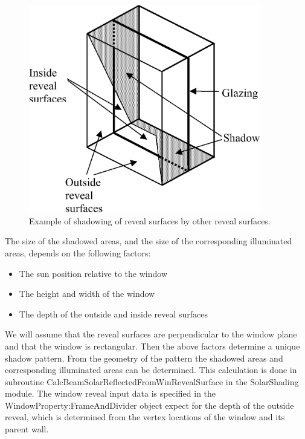 \begin{figure}[hbtp] %
\centering
\includegraphics[width=0.9\textwidth, height=0.9\textheight, keepaspectratio=true]{media/image1593.png}
\caption{Example of shadowing of reveal surfaces by other reveal surfaces. \protect \label{fig:example-of-shadowing-of-reveal-surfaces-by}}
\end{figure}

The size of the shadowed areas, and the size of the corresponding illuminated areas, depends on the following factors:

\begin{itemize}
\item
  The sun position relative to the window
\item
  The height and width of the window
\item
  The depth of the outside and inside reveal surfaces
\end{itemize}

We will assume that the reveal surfaces are perpendicular to the window plane and that the window is rectangular. Then the above factors determine a unique shadow pattern. From the geometry of the pattern the shadowed areas and corresponding illuminated areas can be determined. This calculation is done in subroutine CalcBeamSolarReflectedFromWinRevealSurface in the SolarShading module. The window reveal input data is specified in the WindowProperty:FrameAndDivider object expect for the depth of the outside reveal, which is determined from the vertex locations of the window and its parent wall.

